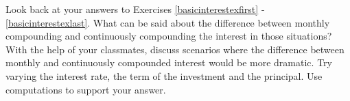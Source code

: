 {Look back at your answers to Exercises \ref{basicinterestexfirst} - \ref{basicinterestexlast}. What can be said about the difference between monthly compounding and continuously compounding the interest in those situations?  With the help of your classmates, discuss scenarios where the difference between monthly  and continuously compounded interest would be more dramatic.  Try varying the interest rate, the term of the investment and the principal.  Use computations to support your answer.}
{}